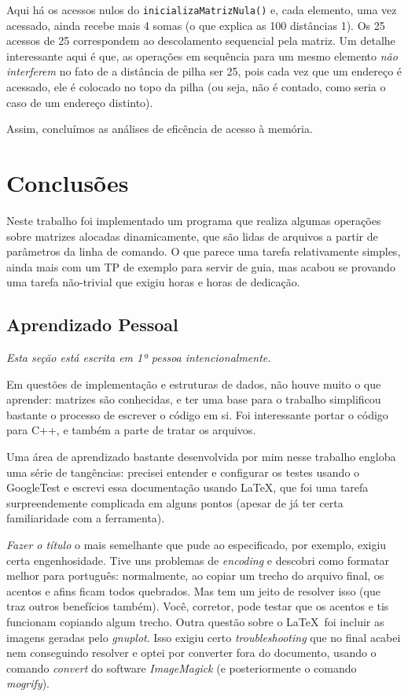 \documentclass{article}
\def\code#1{\texttt{#1}}
\begin{document}
Aqui há os acessos nulos do \code{inicializaMatrizNula()} e, cada elemento, uma vez acessado, ainda recebe mais 4 somas (o que explica as 100 distâncias 1). Os 25 acessos de 25 correspondem ao descolamento sequencial pela matriz. Um detalhe interessante aqui é que, as operações em sequência para um mesmo elemento \textit{não interferem} no fato de a distância de pilha ser 25, pois cada vez que um endereço é acessado, ele é colocado no topo da pilha (ou seja, não é contado, como seria o caso de um endereço distinto).

Assim, concluímos as análises de eficência de acesso à memória.

\section{Conclusões}

Neste trabalho foi implementado um programa que realiza algumas operações sobre matrizes alocadas dinamicamente, que são lidas de arquivos a partir de parâmetros da linha de comando. O que parece uma tarefa relativamente simples, ainda mais com um TP de exemplo para servir de guia, mas acabou se provando uma tarefa não-trivial que exigiu horas e horas de dedicação.

\subsection{Aprendizado Pessoal}

\textit{Esta seção está escrita em 1ª pessoa intencionalmente.}

Em questões de implementação e estruturas de dados, não houve muito o que aprender: matrizes são conhecidas, e ter uma base para o trabalho simplificou bastante o processo de escrever o código em si. Foi interessante portar o código para C++, e também a parte de tratar os arquivos.

Uma área de aprendizado bastante desenvolvida por mim nesse trabalho engloba uma série de tangências: precisei entender e configurar os testes usando o GoogleTest e escrevi essa documentação usando \LaTeX, que foi uma tarefa surpreendemente complicada em alguns pontos (apesar de já ter certa familiaridade com a ferramenta). 

\textit{Fazer o título} o mais semelhante que pude ao especificado, por exemplo, exigiu certa engenhosidade. Tive uns problemas de \textit{encoding} e descobri como formatar melhor para português: normalmente, ao copiar um trecho do arquivo final, os acentos e afins ficam todos quebrados. Mas tem um jeito de resolver isso (que traz outros benefícios também). Você, corretor, pode testar que os acentos e tis funcionam copiando algum trecho. Outra questão sobre o \LaTeX\  foi incluir as imagens geradas pelo \textit{gnuplot}. Isso exigiu certo \textit{troubleshooting} que no final acabei nem conseguindo resolver e optei por converter fora do documento, usando o comando \textit{convert} do software \textit{ImageMagick} (e posteriormente o comando \textit{mogrify}).
\end{document}
